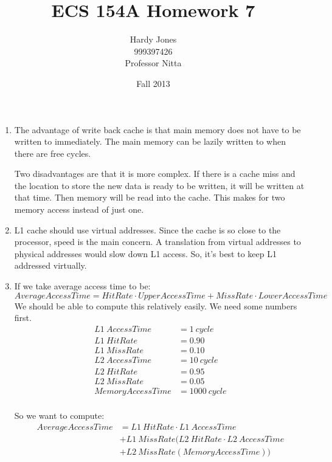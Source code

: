 \documentclass[12pt,letterpaper]{article}
\title{ECS 154A Homework 7\vspace{-2ex}}
\author{Hardy Jones\\
        999397426\\
        Professor Nitta\vspace{-2ex}}
\date{Fall 2013}
\begin{document}
  \maketitle

  \begin{enumerate}
    \item
      The advantage of write back cache is that main memory does not have to be written to immediately.
      The main memory can be lazily written to when there are free cycles.

      Two disadvantages are that it is more complex.
      If there is a cache miss and the location to store the new data is ready to be written, it will be written at that time.
      Then memory will be read into the cache.
      This makes for two memory access instead of just one.

    \item
      L1 cache should use virtual addresses.
      Since the cache is so close to the processor, speed is the main concern.
      A translation from virtual addresses to physical addresses would slow down L1 access.
      So, it's best to keep L1 addressed virtually.

    \item
      If we take average access time to be:
      \[Average Access Time = Hit Rate \cdot Upper Access Time + Miss Rate \cdot Lower Access Time\]
      We should be able to compute this relatively easily.
      We need some numbers first.
      \begin{align*}
        L1 \ Access Time &= 1 \ cycle \\
        L1 \ Hit Rate &= 0.90 \\
        L1 \ Miss Rate &= 0.10 \\
        L2 \ Access Time &= 10 \ cycle \\
        L2 \ Hit Rate &= 0.95 \\
        L2 \ Miss Rate &= 0.05 \\
        Memory Access Time &= 1000 \ cycle \\
      \end{align*}

      So we want to compute:
      \begin{align*}
        Average Access Time &= L1 \ Hit Rate \cdot L1 \ Access Time \\
        &+ L1 \ Miss Rate (L2 \ Hit Rate \cdot L2 \ Access Time \\
        &+ L2 \ Miss Rate (Memory Access Time))
      \end{align*}


\end{enumerate}
\end{document}
